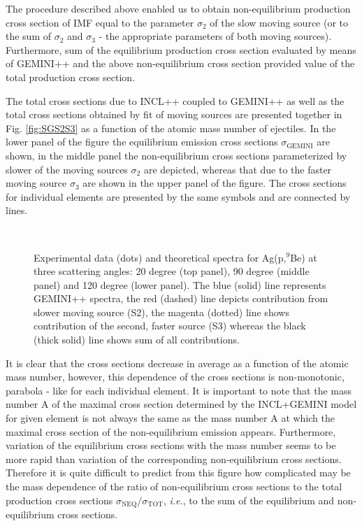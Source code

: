 The procedure described above enabled us to obtain non-equilibrium
production cross section of IMF equal to the parameter $\sigma_2$ of
the slow moving source (or to the sum of $\sigma_2$ and $\sigma_3$ -
the appropriate parameters of both moving sources).  Furthermore,
sum of the equilibrium production cross section evaluated by means
of GEMINI++ and the above non-equilibrium cross section provided
value of the total production cross section.

The total cross sections due to INCL++ \cite{Mancusi2014} coupled to
GEMINI++ \cite{GEMINI++} as well as the total cross sections
obtained by fit of moving sources are presented together in Fig.
\ref{fig:SGS2S3} as a function of the atomic mass number of
ejectiles. In the lower panel of the figure the equilibrium emission
cross sections $\sigma_{\text{GEMINI}}$ are shown, in the middle
panel the non-equilibrium cross sections parameterized by slower of
the moving sources $\sigma_2$ are depicted, whereas that due to the
faster moving source $\sigma_{3}$ are shown in the upper panel of
the figure.  The cross sections for individual elements are
presented by the same symbols and are connected by lines.





\begin{figure}
  \centering
  \\
  \caption{Experimental data (dots) and theoretical spectra for Ag(p,$^9$Be) at three
  scattering angles: 20 degree (top panel), 90 degree (middle panel) and 120 degree (lower panel).
  The blue (solid) line represents GEMINI++ spectra, the red (dashed) line depicts contribution
  from slower moving source (S2), the magenta (dotted) line shows contribution of the second, faster
  source (S3) whereas the black (thick solid) line shows sum of all contributions.}
  \label{fig:9BeGEMINIS2S3}
\end{figure}


It is clear that the cross sections decrease in average as a
function of the atomic mass number, however, this dependence of the
cross sections is non-monotonic, parabola - like  for each
individual element. It is important to note that the mass number A
of the maximal cross section  determined by the INCL+GEMINI model
for given element is not always the same as the mass number A at
which the maximal cross section of the non-equilibrium emission
appears. Furthermore, variation of the equilibrium cross sections
with the mass number seems to be more rapid than variation of the
corresponding non-equilibrium cross sections. Therefore it is quite
difficult to predict from this figure how complicated may be the
mass dependence of the ratio of non-equilibrium cross sections to
the total production cross sections
$\sigma_{\text{NEQ}}/\sigma_{\text{TOT}}$, \emph{i.e.}, to the sum
of the equilibrium and non-equilibrium cross sections.



